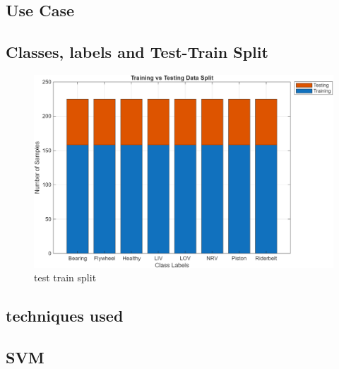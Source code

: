 \documentclass[12pt,a4paper]{article}
\begin{document}
\begin{multicols}{2}
\section{Use Case}
\subsection{Classes, labels and Test-Train Split}
\begin{figure}[H]
    \centering
    \includegraphics[width=0.85\linewidth]{split.png}
    \caption{test train split}
    \label{fig:placeholder}
\end{figure}
\subsection{techniques used}
\subsection{SVM}

\end{multicols}
\end{document}
